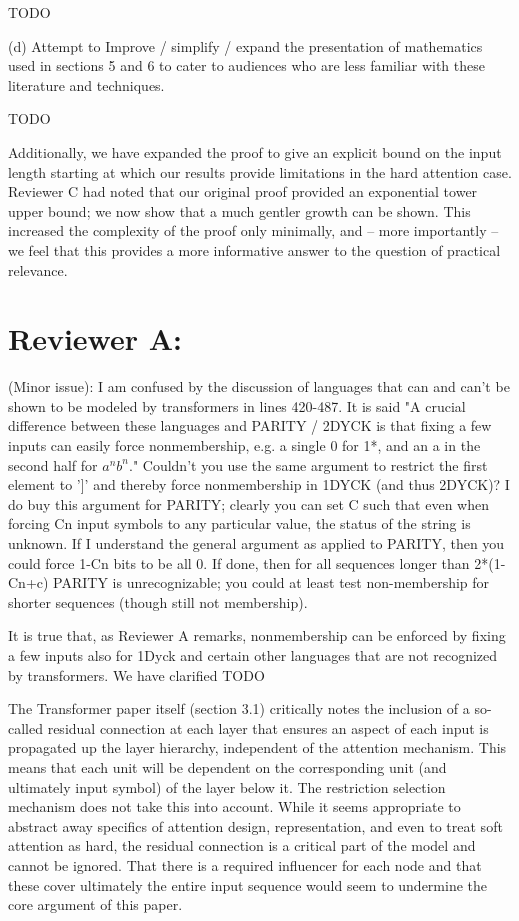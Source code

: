 \documentclass[11pt,a4paper]{article}
\newcommand\response[1]{{\color{blue}#1}}
\begin{document}
\response{TODO}

(d) Attempt to Improve / simplify / expand the presentation of mathematics
used in sections 5 and 6 to cater to audiences who are less familiar with
these literature and techniques.

\response{TODO}

\response{Additionally, we have expanded the proof to give an explicit bound on the input length starting at which our results provide limitations in the hard attention case. Reviewer C had noted that our original proof provided an exponential tower upper bound; we now show that a much gentler growth can be shown. This increased the complexity of the proof only minimally, and -- more importantly -- we feel that this provides a more informative answer to the question of practical relevance.}

\section{Reviewer A:}

(Minor issue): I am confused by the discussion of languages that can and
can't be
shown to be modeled by transformers in lines 420-487. It is said "A
crucial difference between these languages and PARITY / 2DYCK is that
fixing a few inputs can easily force nonmembership, e.g. a single 0
for 1*, and an a in the second half for $a^n b^n$." Couldn't you use the
same argument to restrict the first element to ']' and thereby force
nonmembership in 1DYCK (and thus 2DYCK)? I do buy this
argument for PARITY; clearly you can set C such that even when forcing
Cn input symbols to any particular value, the status of the string is
unknown. If I understand the general argument as applied to PARITY,
then you could force 1-Cn bits to be all 0. If done, then for all
sequences longer than 2*(1-Cn+c) PARITY is unrecognizable; you could
at least test non-membership for shorter sequences (though still not
membership).

\response{It is true that, as Reviewer A remarks, nonmembership can be enforced by fixing a few inputs also for 1Dyck and certain other languages that are not recognized by transformers. We have clarified TODO}


The Transformer paper itself (section 3.1) critically notes the
inclusion of a so-called residual connection
at each layer that ensures an aspect of each input is propagated up the
layer
hierarchy, independent of the attention mechanism. This means that
each unit will be dependent on the corresponding unit (and ultimately
input symbol) of the layer below it. The restriction selection
mechanism does not take this into account. While it seems appropriate to
abstract away specifics of attention design, representation, and even
to treat soft attention as hard, the residual connection is a critical part
of the model and cannot be ignored. That there is a required
influencer for each node and that these cover ultimately the entire
input sequence would seem to undermine the core argument of this paper.
\end{document}
